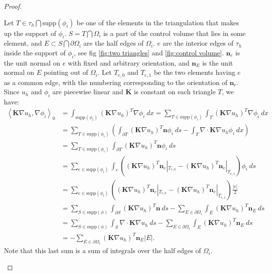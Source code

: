 \documentclass[../Main/main.tex]{subfiles}
\begin{document}
\begin{proof}
\begin{enumerate}
			 Let $T \in \tau_h \bigcap \text{supp}(\phi_i)$ be one of the elements in the triangulation that makes up the support of $\phi_i$. $S=T\bigcap \Omega_i$ is a part of the control volume that lies in some element, and $E \subset S\bigcap \partial \Omega_i$ are the half edges of $\Omega_i$. $e$ are the interior edges of $\tau_h$ inside the support of $\phi_i$, see fig \ref{fig:two triangles} and \ref{fig:control volume}. $\bm{n}_e$ is the unit normal on $e$ with fixed and arbitrary orientation, and $\pmb{n}_E$ is the unit normal on $E$ pointing out of $\Omega_i$. Let $T_{e,0}$ and $T_{e,1}$ be the two elements having $e$ as a common edge, with the numbering corresponding to the orientation of $\bm{n}_e$. Since $u_h$ and $\phi_i$ are piecewise linear and $\bm{K}$ is constant on each triangle $T$, we have:
			\begin{equation}\label{eq:big computation}
				\begin{aligned}
					\left \langle\bm{K}\nabla u_h, \nabla \phi_i \right \rangle_0 &= \int_{\text{supp}(\phi_i)} (\bm{K}\nabla u_h)^T\nabla \phi_i \ dx = \sum_{T\in \text{supp}(\phi_i)} \int_T (\bm{K}\nabla u_h)^T\nabla \phi_i \ dx \\
					&= \sum_{T\in \text{supp}(\phi_i)} \left ( \int_{\partial T} (\pmb{K}\nabla u_h)^T\bm{n}\phi_i \ ds-\int_T \nabla \cdot\bm{K} \nabla u_h \phi_i \ dx \right ) \\
					&=\sum_{T\in \text{supp}(\phi_i)}\int_{\partial T} (\bm{K}\nabla u_h)^T\bm{n}\phi_i \ ds \\
					&= \sum_{e\in \text{supp}(\phi_i)} \int_e \left ((\bm{K}\nabla u_h)^T\bm{n}_e|_{T_{e,0}} - (\bm{K}\nabla u_h)^T\bm{n}_e|_{T_{e,1}} \right )\phi_i \ ds\\
					&= \sum_{e\in \text{supp}(\phi_i)}
					\left ((\bm{K}\nabla u_h)^T\bm{n}_e|_{T_{e,0}} - (\bm{K}\nabla u_h)^T\bm{n}_e|_{T_{e,1}} \right ) \frac{|e|}{2}\\
					&=\sum_{S\in \text{supp}(\phi)}\int_{\partial S}  (\bm{K}\nabla u_h)^T\bm{n} \ ds - \sum_{E\in \partial \Omega_i}\int_E (\bm{K}\nabla u_h)^T\bm{n}_E \ ds\\
					&= \sum_{S\in \text{supp}(\phi)}\int_{ S} \nabla \cdot\bm{K}\nabla u_h \ ds - \sum_{E\in \partial \Omega_i}\int_E (\pmb{K}\nabla u_h)^T\bm{n}_E \ ds\\
					&=- \sum_{E\in \partial \Omega_i} (\pmb{K}\nabla u_h)^T\bm{n}_E |E| .
				\end{aligned}
			\end{equation}
			Note that this last sum is a sum of integrals over the half edges of $\Omega_i$. 

\end{enumerate}
\end{proof}
\end{document}
